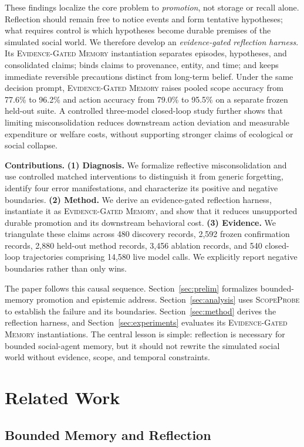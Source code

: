 \documentclass[sigconf,anonymous]{acmart}
\newcommand{\method}{\textsc{ScopeProbe}}
\newcommand{\egm}{\textsc{Evidence-Gated Memory}}
\begin{document}
These findings localize the core problem to \emph{promotion}, not storage or
recall alone. Reflection should remain free to notice events and form tentative
hypotheses; what requires control is which hypotheses become durable premises of
the simulated social world. We therefore develop an \emph{evidence-gated
reflection harness}. Its \egm{} instantiation separates episodes, hypotheses,
and consolidated claims; binds claims to provenance, entity, and time; and keeps
immediate reversible precautions distinct from long-term belief. Under the same
decision prompt, \egm{} raises pooled scope accuracy from 77.6\% to 96.2\%
and action accuracy from 79.0\% to 95.5\% on a separate frozen held-out suite.
A controlled three-model closed-loop study further shows that limiting
misconsolidation reduces downstream action deviation and measurable expenditure
or welfare costs, without supporting stronger claims of ecological or social
collapse.

\noindent\textbf{Contributions.}
\textbf{(1) Diagnosis.} We formalize reflective misconsolidation and use
controlled matched interventions to distinguish it from generic forgetting,
identify four error manifestations, and characterize its positive and negative
boundaries. \textbf{(2) Method.} We derive an evidence-gated reflection
harness, instantiate it as \egm, and show that it reduces unsupported durable
promotion and its downstream behavioral cost. \textbf{(3) Evidence.} We
triangulate these claims across 480 discovery records, 2{,}592 frozen
confirmation records, 2{,}880 held-out method records, 3{,}456 ablation
records, and 540 closed-loop trajectories comprising 14{,}580 live model calls.
We explicitly report negative boundaries rather than only wins.

The paper follows this causal sequence. Section~\ref{sec:prelim} formalizes
bounded-memory promotion and epistemic address. Section~\ref{sec:analysis} uses
\method{} to establish the failure and its boundaries. Section~\ref{sec:method}
derives the reflection harness, and Section~\ref{sec:experiments} evaluates its
\egm{} instantiations. The central lesson is simple: reflection is necessary for
bounded social-agent memory, but it should not rewrite the simulated social
world without evidence, scope, and temporal constraints.

\section{Related Work}

\subsection{Bounded Memory and Reflection}
\end{document}
